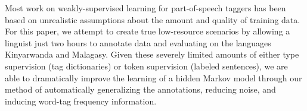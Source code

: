 Most work on weakly-supervised learning for part-of-speech taggers has been based on unrealistic assumptions about the amount and quality of training data.
 For this paper, we attempt to create true low-resource scenarios by allowing a
 linguist just two hours to annotate data and evaluating on the languages
 Kinyarwanda and Malagasy. Given these severely limited amounts of either type
 supervision (tag dictionaries) or token supervision (labeled sentences), we are
 able to dramatically improve the learning of a hidden Markov model through our
 method of automatically generalizing the annotations, reducing noise, and
 inducing word-tag frequency information.

